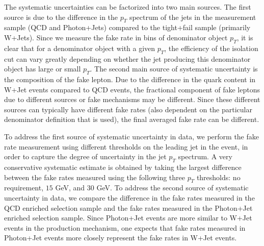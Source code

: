 The systematic uncertainties can be factorized into two main sources. 
The first source is due to the difference in the $p_{T}$ spectrum 
of the jets in the measurement sample (QCD and Photon+Jets) compared
to the tight+fail sample (primarily W+Jets). Since we measure the 
fake rate in bins of denominator object $p_{T}$, it is clear that
for a denominator object with a given $p_{T}$, the efficiency of the
isolation cut can vary greatly depending on whether the jet producing
this denominator object has large or small $p_{T}$. The second main
source of systematic uncertainty is the composition of the fake lepton.
Due to the difference in the quark content in W+Jet events compared
to QCD events, the fractional component of fake leptons due to different 
sources or fake mechanisms may be different. Since these different sources
can typically have different fake rates (also dependent on the particular 
denominator definition that is used), the final averaged fake rate can 
be different.

To address the first source of systematic uncertainty in data, we perform the
fake rate measurement using different thresholds on the leading jet
in the event, in order to capture the degree of uncertainty in 
the jet $p_{T}$ spectrum. A very conservative systematic estimate
is obtained by taking the largest difference between the fake rates
measured using the following three $p_{T}$ thresholds: no requirement,
 $15$ GeV, and $30$ GeV. To address the second source of systematic
uncertainty in data, we compare the difference in the fake rates 
measured in the QCD enriched selection sample and the fake rates 
measured in the Photon+Jet enriched selection sample. Since Photon+Jet
events are more similar to W+Jet events in the production mechanism,
one expects that fake rates measured in Photon+Jet events more closely
represent the fake rates in W+Jet events. 

